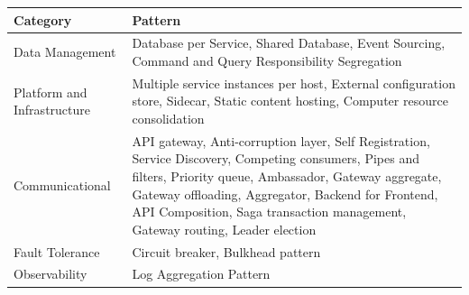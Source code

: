 \documentclass[conference]{IEEEtran}
\begin{document}
  
\begin{center}
    \begin{table}
    \renewcommand*{\arraystretch}{1.8}
    \begin{tabular}{ | m{3cm} | m{12cm} | }

        \hline

        Category &  Pattern
 
        \\

        \hline

        Data Management &  Database per Service, Shared Database, Event Sourcing, Command and Query Responsibility Segregation
 
        \\

        \hline

        Platform and Infrastructure & Multiple service instances per host, External configuration store, Sidecar, Static content hosting, Computer resource consolidation
 
        \\

        \hline

        Communicational & API gateway,  Anti-corruption layer, Self Registration, Service Discovery, Competing consumers, Pipes and filters, Priority queue, Ambassador, Gateway aggregate, Gateway offloading, Aggregator, Backend for Frontend, API Composition, Saga transaction management, Gateway routing, Leader election
        
 
        \\

        \hline

        Fault Tolerance & Circuit breaker, Bulkhead pattern
 
        \\
        \hline

        Observability & Log Aggregation Pattern
 
        \\
        \hline


    \end{tabular}
    \end{table}
\end{center}
\end{document}
